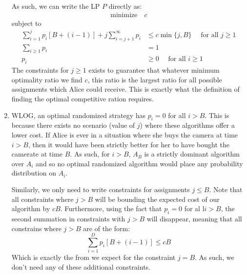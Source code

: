 \documentclass[12pt]{exam}
\begin{document}
\begin{questions}
\begin{solution}
\begin{enumerate}[label=(\alph*)]
      As such, we can write the LP $P$ directly as:
      \begin{align}
      \text{minimize} \quad c
      \end{align}
      subject to
      \begin{align}
        \sum_{i=1}^{j} p_i[B + (i-1)] + j \sum_{i=j+1}^\infty p_i & \leq c \min\{j, B\} \quad \text{ for all } j \geq 1 \\
        \sum_{i \geq 1} p_i &= 1 \\
        p_i &\geq 0 \quad \text{ for all $i \geq 1$}
      \end{align}
      The constraints for $j \geq 1$ exists to guarantee that whatever minimum optimality ratio we find $c$, this ratio is the largest ratio for all possible assignments which Alice could receive. This is exactly what the definition of finding the optimal competitive ration requires.
    \item
      WLOG, an optimal randomized strategy has $p_i = 0$ for all $i > B$. This is because there exists no scenario (value of $j$) where these algorithms offer a lower cost. If Alice is ever in a situation where she buys the camera at time $i > B$, then it would have been strictly better for her to have bought the camerate at time $B$. As such, for $i > B$, $A_B$ is a strictly dominant algorithm over $A_i$ and so no optimal randomized algorithm would place any probability distribution on $A_i$.

      Similarly, we only need to write constraints for assignments $j \leq B$. Note that all constraints where $j > B$ will be bounding the expected cost of our algorithm by $cB$. Furthermore, using the fact that $p_i = 0$ for al l$i > B$, the second summation in constraints with $j > B$ will disappear, meaning that all constrains where $j > B$ are of the form:
      \[
        \sum_{i=1}^D p_i[B + (i-1)] \leq cB
      \]
      Which is exactly the from we expect for the constraint $j = B$. As such, we don't need any of these additional constraints.


\end{enumerate}
\end{solution}
\end{questions}
\end{document}
